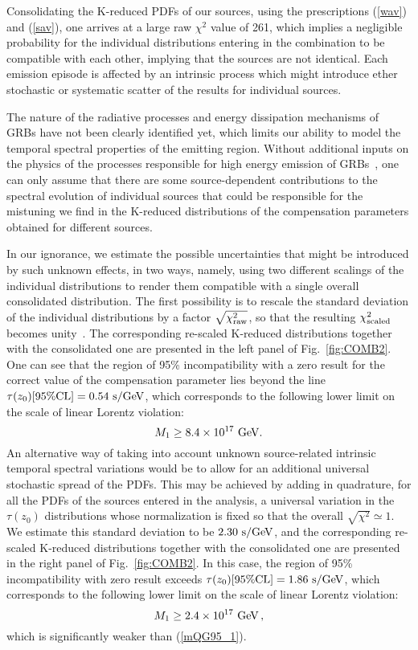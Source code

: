 \documentclass[12pt]{article}
\newcommand{\beq}{\begin{equation}}
\newcommand{\eeq}{\end{equation}}
\begin{document}
{Consolidating the K-reduced PDFs of our sources, using the prescriptions (\ref{wav}) and (\ref{sav}), one arrives at a large
raw $\chi^2$ value of 261,
which implies a negligible probability for the individual distributions entering in the combination to be
compatible with each other, implying that the sources are not identical.
Each emission episode is affected by an intrinsic process which might introduce ether stochastic or systematic scatter of the results
for individual sources.

The nature of the radiative processes and energy dissipation
mechanisms of GRBs have not been clearly identified yet, which limits our ability
to model the temporal spectral properties of the emitting region.
Without additional inputs on the physics of the processes
responsible for high energy emission of GRBs~\cite{HE_GRB}, one can
only assume that there are some source-dependent contributions to the spectral evolution of individual sources that
could be responsible for the mistuning we find in the K-reduced distributions of the compensation parameters
obtained for different sources.

In our ignorance, we estimate the possible uncertainties that might be introduced by such unknown effects,
in two ways, namely, using two different scalings of the individual distributions to render them
compatible with a single overall consolidated distribution.
The first possibility is to rescale the standard deviation of the individual distributions by a factor $\sqrt{\chi_{\rm raw}^2}$,
so that the resulting $\chi_{\rm scaled}^2$ becomes unity~\cite{PDG}.
The corresponding re-scaled K-reduced distributions together with the consolidated one are presented in
the left panel of Fig.~\ref{fig:COMB2}.
One can see that the region of 95\% incompatibility with a zero result for the
correct value of the compensation parameter lies beyond the
line $\tau (z_0)[{\rm 95\% CL}] = 0.54\ {\rm s/GeV}$,
which corresponds to the following lower limit on the scale of linear
Lorentz violation:
\beq
\label{mQG95_1}
M_1\ge 8.4\times 10^{17}\ {\rm GeV}.
\eeq
An alternative way of taking into account unknown source-related intrinsic temporal spectral variations would be
to allow for an additional universal
stochastic spread of the PDFs. This may be achieved by adding in quadrature,
for all the PDFs of the sources entered in the analysis, a universal variation in the $\tau (z_0)$ distributions
whose normalization is fixed so that the overall
$\sqrt{\chi^2}\simeq 1$. We estimate this standard deviation to be $2.30\ {\rm s/GeV}$, and
the corresponding re-scaled K-reduced distributions together with the consolidated one are presented in the
right panel of Fig.~\ref{fig:COMB2}. In this case, the region of 95\% incompatibility with zero result exceeds
$\tau (z_0)[{\rm 95\% CL}] = 1.86\ {\rm s/GeV}$, which corresponds to the following lower limit on the
scale of linear Lorentz violation:
\beq
\label{mQG95_2}
M_1\ge 2.4\times 10^{17}\ {\rm GeV} \, ,
\eeq
which is significantly weaker than (\ref{mQG95_1}).

}
\end{document}
